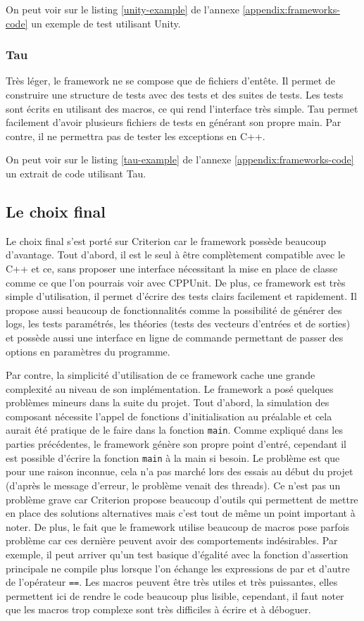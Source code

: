 \documentclass[a4paper]{article}
\begin{document}
On peut voir sur le listing \ref{unity-example} de l'annexe
\ref{appendix:frameworks-code} un exemple de test utilisant Unity.

\subsubsection*{Tau}

Très léger, le framework ne se compose que de fichiers d'entête. Il permet de
construire une structure de tests avec des tests et des suites de tests. Les
tests sont écrits en utilisant des macros, ce qui rend l'interface très simple.
Tau permet facilement d'avoir plusieurs fichiers de tests en générant son propre
main. Par contre, il ne permettra pas de tester les exceptions en C++.

On peut voir sur le listing \ref{tau-example} de l'annexe
\ref{appendix:frameworks-code} un extrait de code utilisant Tau.
\subsection{Le choix final}%

Le choix final s'est porté sur Criterion car le framework possède beaucoup
d'avantage. Tout d'abord, il est le seul à être complètement compatible avec le
C++ et ce, sans proposer une interface nécessitant la mise en place de classe
comme ce que l'on pourrais voir avec CPPUnit. De plus, ce framework est très
simple d'utilisation, il permet d'écrire des tests clairs facilement et
rapidement. Il propose aussi beaucoup de fonctionnalités comme la possibilité de
générer des logs, les tests paramétrés, les théories (tests des vecteurs
d'entrées et de sorties) et possède aussi une interface en ligne de commande
permettant de passer des options en paramètres du programme.

Par contre, la simplicité d'utilisation de ce framework cache une grande
complexité au niveau de son implémentation. Le framework a posé quelques
problèmes mineurs dans la suite du projet. Tout d'abord, la simulation des
composant nécessite l'appel de fonctions d'initialisation au préalable et cela
aurait été pratique de le faire dans la fonction \verb|main|. Comme
expliqué dans les parties précédentes, le framework génère son propre point
d'entré, cependant il est possible d'écrire la fonction \verb|main| à la
main si besoin. Le problème est que pour une raison inconnue, cela n'a pas
marché lors des essais au début du projet (d'après le message d'erreur, le
problème venait des threads). Ce n'est pas un problème grave car Criterion
propose beaucoup d'outils qui permettent de mettre en place des solutions
alternatives mais c'est tout de même un point important à noter. De plus, le
fait que le framework utilise beaucoup de macros pose parfois problème car ces
dernière peuvent avoir des comportements indésirables. Par exemple, il peut
arriver qu'un test basique d'égalité avec la fonction d'assertion principale ne
compile plus lorsque l'on échange les expressions de par et d'autre de
l'opérateur \verb|==|. Les macros peuvent être très utiles et très
puissantes, elles permettent ici de rendre le code beaucoup plus lisible,
cependant, il faut noter que les macros trop complexe sont très difficiles à
écrire et à déboguer.
\end{document}
